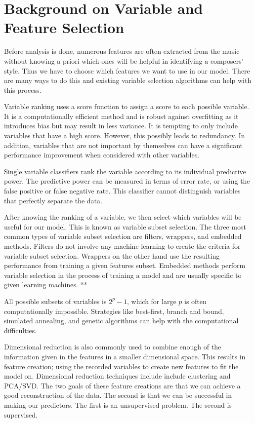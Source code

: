 \documentclass[12pt,twoside]{reedthesis}
\theoremstyle{definition}
\theoremstyle{definition}
\theoremstyle{definition}
\theoremstyle{remark}
\begin{document}
\section{Background on Variable and Feature
Selection}\label{background-on-variable-and-feature-selection}

Before analysis is done, numerous features are often extracted from the
music without knowing a priori which ones will be helpful in identifying
a composers' style. Thus we have to choose which features we want to use
in our model. There are many ways to do this and existing variable
selection algorithms can help with this process.

Variable ranking uses a score function to assign a score to each
possible variable. It is a computationally efficient method and is
robust against overfitting as it introduces bias but may result in less
variance. It is tempting to only include variables that have a high
score. However, this possibly leads to redundancy. In addition,
variables that are not important by themselves can have a significant
performance improvement when considered with other variables.

Single variable classifiers rank the variable according to its
individual predictive power. The predictive power can be measured in
terms of error rate, or using the false positive or false negative rate.
This classifier cannot distinguish variables that perfectly separate the
data.

After knowing the ranking of a variable, we then select which variables
will be useful for our model. This is known as variable subset
selection. The three most common types of variable subset selection are
filters, wrappers, and embedded methods. Filters do not involve any
machine learning to create the criteria for variable subset selection.
Wrappers on the other hand use the resulting performance from training a
given features subset. Embedded methods perform variable selection in
the process of training a model and are usually specific to given
learning machines. **

All possible subsets of variables is \(2^p-1\), which for large \(p\) is
often computationally impossible. Strategies like best-first, branch and
bound, simulated annealing, and genetic algorithms can help with the
computational difficulties.

Dimensional reduction is also commonly used to combine enough of the
information given in the features in a smaller dimensional space. This
results in feature creation; using the recorded variables to create new
features to fit the model on. Dimensional reduction techniques include
include clustering and PCA/SVD. The two goals of these feature creations
are that we can achieve a good reconstruction of the data. The second is
that we can be successful in making our predictors. The first is an
unsupervised problem. The second is supervised.
\end{document}
